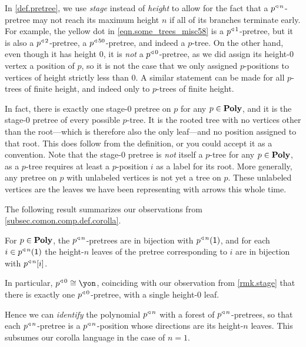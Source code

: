 \documentclass[Book-Poly]{subfiles}
\begin{document}
\begin{remark} \label{rmk.stage}
In \cref{def.pretree}, we use \emph{stage} instead of \emph{height} to allow for the fact that a $p^{\mathbin{\triangleleft}\,n}$-pretree may not reach its maximum height $n$ if all of its branches terminate early.
For example, the yellow dot in \eqref{eqn.some_trees_misc58} is a $p^{\mathbin{\triangleleft}\,1}$-pretree, but it is also a $p^{\mathbin{\triangleleft}\,2}$-pretree, a $p^{\mathbin{\triangleleft}\,50}$-pretree, and indeed a $p$-tree.
On the other hand, even though it has height $0$, it is \emph{not} a $p^{\mathbin{\triangleleft}\,0}$-pretree, as we did assign its height-$0$ vertex a position of $p$, so it is not the case that we only assigned $p$-positions to vertices of height strictly less than $0$.
A similar statement can be made for all $p$-trees of finite height, and indeed only to $p$-trees of finite height.

In fact, there is exactly one stage-$0$ pretree on $p$ for any $p\in\mathbf{Poly}$, and it is the stage-$0$ pretree of every possible $p$-tree.
It is the rooted tree with no vertices other than the root---which is therefore also the only leaf---and no position assigned to that root.
This does follow from the definition, or you could accept it as a convention.
Note that the stage-$0$ pretree is \emph{not} itself a $p$-tree for any $p\in\mathbf{Poly}$, as a $p$-tree requires at least a $p$-position $i$ as a label for its root.
More generally, any pretree on $p$ with unlabeled vertices is not yet a tree on $p$.
These unlabeled vertices are the leaves we have been representing with arrows this whole time.
\end{remark}

The following result summarizes our observations from \cref{subsec.comon.comp.def.corolla}.

\begin{proposition} \label{prop.tripow_pretree}
For $p\in\mathbf{Poly}$, the $p^{\mathbin{\triangleleft}\,n}$-pretrees are in bijection with $p^{\mathbin{\triangleleft}\,n}(\textsf{1})$, and for each $i\in p^{\mathbin{\triangleleft}\,n}(\textsf{1})$ the height-$n$ leaves of the pretree corresponding to $i$ are in bijection with $p^{\mathbin{\triangleleft}\,n}[i]$.
\end{proposition}
In particular, $p\tripow0\iso\yon$, coinciding with our observation from \cref{rmk.stage} that there is exactly one $p^{\mathbin{\triangleleft}\,0}$-pretree, with a single height-$0$ leaf.

Hence we can \emph{identify} the polynomial $p^{\mathbin{\triangleleft}\,n}$ with a forest of $p^{\mathbin{\triangleleft}\,n}$-pretrees, so that each $p^{\mathbin{\triangleleft}\,n}$-pretree is a $p^{\mathbin{\triangleleft}\,n}$-position whose directions are its height-$n$ leaves.
This subsumes our corolla language in the case of $n=1$.
\end{document}
